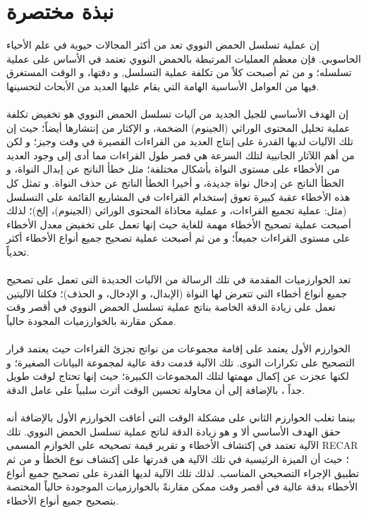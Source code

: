 \documentclass{llncs}
\begin{document}


\chapter*{نبذة مختصرة}
إن عملية تسلسل الحمض النووي تعد من أكثر المجالات حيوية في علم الأحياء الحاسوبي. فإن معظم العمليات المرتبطة بالحمض النووي تعتمد في الأساس على عملية تسلسله؛ و من ثم أصبحت كلاً من تكلفة عملية التسلسل, و دقتها، و الوقت المستغرق فيها من العوامل الأساسية الهامة التي يقام عليها العديد من الأبحاث لتحسينها.
\\
\\
إن الهدف الأساسي للجيل الجديد من آليات تسلسل الحمض النووي هو تخفيض تكلفة عملية تحليل المحتوى الوراثي (الجينوم) الضخمة، و الإكثار من إنتشارها أيضاً؛ حيث إن تلك الآليات لديها القدرة على إنتاج العديد من القراءات القصيرة في وقت وجيز؛ و لكن من أهم اللآثار الجانبية لتلك السرعة هي قصر طول القراءات مما أدى إلى وجود العديد من الأخطاء على مستوى النواة بأشكال مختلفة؛ مثل خطأ الناتج عن إبدال النواة، و الخطأ الناتج عن إدخال نواة جديدة، و أخيرا الخطأ الناتج عن حذف النواة. و تمثل كل هذه الأخطاء عقبة كبيرة تعوق إستخدام القراءات في المشاريع القائمة على التسلسل (مثل:  عملية تجميع القراءات، و عملية محاذاة المحتوى الوراثي (الجينوم)، إلخ)؛ لذلك أصبحت عملية تصحيح الأخطاء مهمة للغاية حيث إنها تعمل على تخفيض معدل الأخطاء على مستوى القراءات جميعاً؛ و من ثم أصبحت عملية تصحيح جميع أنواع الأخطاء أكثر تحدياً.
\\
\\ 
 تعد الخوارزميات المقدمة في تلك الرسالة من الآليات الجديدة التى تعمل على تصحيح جميع أنواع أخطاء التي تتعرض لها النواة (الإبدال، و الإدخال، و الحذف)؛ فكلتا الآليتين تعمل على زيادة الدقة الخاصة بناتج عملية تسلسل الحمض النووي في أقصر وقت ممكن مقارنة بالخوارزميات المجودة حالياً.
\\
\\
الخوارزم الأول يعتمد على إقامة مجموعات من نواتج تجزئ القراءات حيث يعتمد قرار التصحيح على تكرارات النوى. تلك الآلية قدمت دقة عالية لمجموعة البيانات الصغيرة؛ و لكنها عجزت عن إكمال مهمتها لتلك المجموعات الكبيرة؛ حيث إنها تحتاج لوقت طويل جداً ، بالإضافة إلى أن محاولة تحسين الوقت أثرت سلبياً على عامل الدقة.
\\
\\
 بينما تغلب الخوارزم الثاني على مشكلة الوقت التي أعاقت الخوارزم الأول بالإضافة أنه حقق الهدف الأساسي ألا و هو زيادة الدقة لناتج عملية تسلسل الحمض النووي. تلك الآلية تعتمد في إكتشاف الأخطاء و تقرير قيمة تصحيحه على الخوازم المسمى 
 RECAR 
 ؛ حيث أن الميزة الرئيسية في تلك الآلية هي قدرتها على إكتشاف نوع الخطأ و من ثم تطبيق الإجراء التصحيحي المناسب. لذلك تلك الآلية لديها القدرة على تصحيح جميع أنواع الأخطاء بدقة عالية في أقصر وقت ممكن مقارنةً بالخوارزميات الموجودة حالياً المختصة بتصحيح جميع أنواع الأخطاء.
\end{document}
